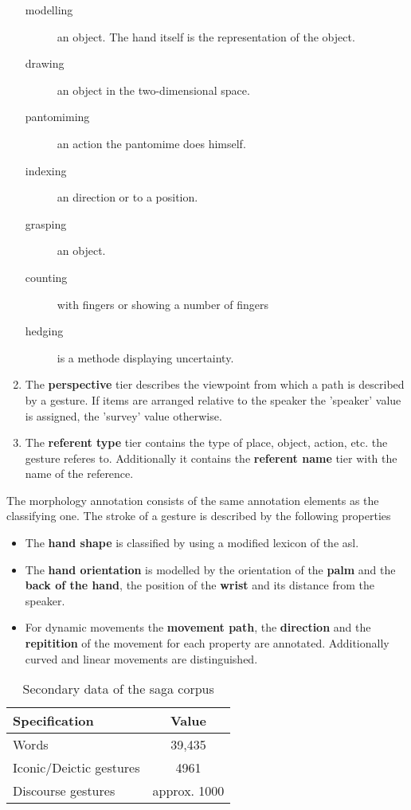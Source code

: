 \documentclass[a4paper]{article}
\begin{document}
\begin{enumerate}
\begin{description}
						\item[modelling] an object. The hand itself is the representation of the object.
						\item[drawing] an object in the two-dimensional space.
						\item[pantomiming] an action the pantomime does himself.
						\item[indexing] an direction or to a position.
						\item[grasping] an object.
						\item[counting] with fingers or showing a number of fingers
						\item[hedging] is a methode displaying uncertainty.
					\end{description}					 
					\item The \textbf{perspective} tier describes the viewpoint from which a path is described by a gesture. If items are arranged relative to the speaker the 'speaker' value is assigned, the 'survey' value otherwise.
					\item The \textbf{referent type} tier contains the type of place, object, action, etc. the gesture referes to. Additionally it contains the \textbf{referent name} tier with the name of the reference.
				\end{enumerate}	
				
				The morphology annotation consists of the same annotation elements as the classifying one. The stroke of a gesture is described by the following properties \cite[ch. 2.2]{Bielefeld2010}
				\begin{itemize}
					\item The \textbf{hand shape} is classified by using a modified lexicon of the \gls{asl}.
					\item The \textbf{hand orientation} is modelled by the orientation of the \textbf{palm} and the \textbf{back of the hand}, the position of the \textbf{wrist} and its distance from the speaker.
					\item For dynamic movements the \textbf{movement path}, the \textbf{direction} and the \textbf{repitition} of the movement for each property are annotated. Additionally curved and linear movements are distinguished.
				\end{itemize}								
			
				\begin{table}
					\center
					\begin{tabular}{|l|c|}
						\hline
						\textbf{Specification} & \textbf{Value} \\ 
						\hline 
						Words & 39,435 \\ 
						\hline 
						Iconic/Deictic gestures & 4961 \\ 
						\hline 
						Discourse gestures & approx. 1000 \\ 
						\hline 
					\end{tabular} 
					\caption{Secondary data of the \gls{saga} corpus \cite{Bielefeld2010}}
				\label{table:sagaSecondary}
				\end{table}
	
\end{document}

